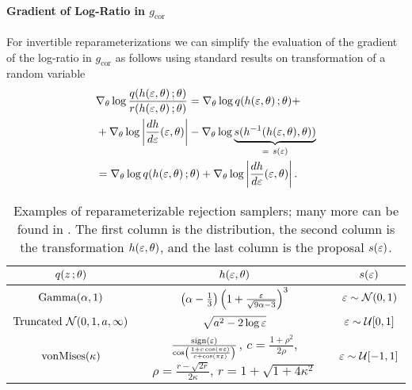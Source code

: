 \paragraph{Gradient of Log-Ratio in $g_{\text{cor}}$}
For invertible reparameterizations we can simplify the evaluation of the gradient of the log-ratio in $g_{\text{cor}}$ as follows using standard results on transformation of a random variable
\begin{align*}
&\nabla_\theta  \log \frac{q(h(\varepsilon,\theta)\, ; \theta)}{r(h(\varepsilon,\theta)\, ; \theta)}  = \nabla_\theta  \log q(h(\varepsilon,\theta)\, ; \theta) +\nonumber\\
& +\nabla_\theta \log \left| \frac{d h}{d\varepsilon}(\varepsilon,\theta) \right|- \nabla_\theta \log \underbrace{s(h^{-1}(h(\varepsilon,\theta),\theta))}_{= ~s(\varepsilon)}\\
&=\nabla_\theta  \log q(h(\varepsilon,\theta)\, ; \theta) + \nabla_\theta \log \left| \frac{d h}{d\varepsilon}(\varepsilon,\theta) \right|.
\end{align*}



\renewcommand{\arraystretch}{2.5}
\begin{table*}[t]
\centering
\begin{tabular}{ccc} 
\toprule
$q(z\, ;\theta)$ & $h(\varepsilon,\theta)$ & $s(\varepsilon)$\\
\hline
$\operatorname*{Gamma}(\alpha,1)$ &$\left(\alpha-\frac{1}{3}\right) \left(1+\frac{\varepsilon}{\sqrt{9\alpha-3}}\right)^3$ & $\varepsilon\sim\mathcal{N}(0,1)$\\
$\operatorname*{Truncated~\mathcal{N}}(0,1,a,\infty)$ & $\sqrt{a^2-2\log \varepsilon}$ & $\varepsilon \sim \mathcal{U}[0,1]$\\
$\operatorname*{von Mises}(\kappa)$ & $\frac{\operatorname*{sign}(\varepsilon)}{\cos\left( \frac{1+c\cos(\pi \varepsilon)}{c+\cos(\pi\varepsilon)} \right)}$, $c = \frac{1+\rho^2}{2\rho}$, $\rho = \frac{r-\sqrt{2r}}{2\kappa}$, $r = 1+\sqrt{1+4\kappa^2}$ & $\varepsilon \sim \mathcal{U}[-1,1]$ \\ \bottomrule
\end{tabular}
\caption{Examples of reparameterizable rejection samplers; many more can be found in \citet{devroye1986}. The first column is the distribution, the second column is the transformation $h(\varepsilon,\theta)$, and the last column is the proposal $s(\varepsilon)$.\label{tab:rep_rejsamplers}}
\end{table*}

